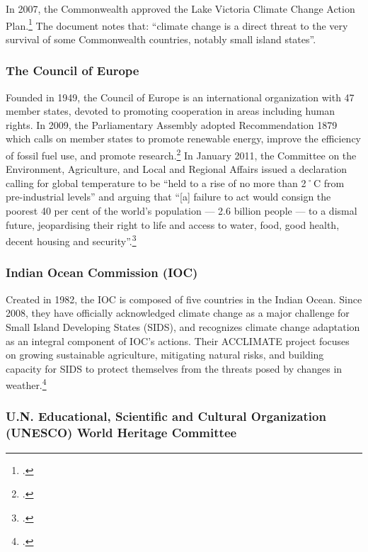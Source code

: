 \documentclass[10pt]{article}
\begin{document}
In 2007, the Commonwealth approved the Lake Victoria Climate Change Action Plan.\footcite[][]{LakeVictoriaPlan}
The document notes that: ``climate change is a direct threat to the very survival of some Commonwealth countries, notably small island states''.



	\subsubsection{The Council of Europe}
	


Founded in 1949, the Council of Europe is an international organization with 47 member states, devoted to promoting cooperation in areas including human rights.
In 2009, the Parliamentary Assembly adopted Recommendation 1879 which calls on member states to promote renewable energy, improve the efficiency of fossil fuel use, and promote research.\footcite[][]{COERec1879}
In January 2011, the Committee on the Environment, Agriculture, and Local and Regional Affairs issued a declaration calling for global temperature to be ``held to a rise of no more than 2˚C from pre-industrial levels'' and arguing that ``[a] failure to act would consign the poorest 40 per cent of the world's population --- 2.6 billion people --- to a dismal future, jeopardising their right to life and access to water, food, good health, decent housing and security''.\footcite[][]{COE2011decl}



	\subsubsection{Indian Ocean Commission (IOC)}
	


Created in 1982, the IOC is composed of five countries in the Indian Ocean.
Since 2008, they have officially acknowledged climate change as a major challenge for Small Island Developing States (SIDS), and recognizes climate change adaptation as an integral component of IOC's actions.
Their ACCLIMATE project focuses on growing sustainable agriculture, mitigating natural risks, and building capacity for SIDS to protect themselves from the threats posed by changes in weather.\footcite[][]{IOCSIDS}



	\subsubsection{U.N. Educational, Scientific and Cultural Organization (UNESCO) World Heritage Committee}
\end{document}

